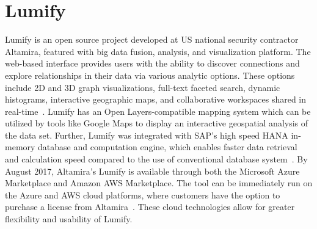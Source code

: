 \section{Lumify}
Lumify is an open source project developed at US national security contractor Altamira, featured with 
big data fusion, analysis, and visualization platform. The web-based interface provides users 
with the ability to discover connections and explore relationships in their data via various analytic 
options. These options include 2D and 3D graph visualizations, full-text faceted search, dynamic 
histograms, interactive geographic maps, and collaborative workspaces shared in 
real-time~\cite{hid-sp18-405-www-lumify}. Lumify has an Open Layers-compatible mapping system 
which can be utilized by tools like Google Maps to display an interactive geospatial analysis of the data 
set. Further, Lumify was integrated with SAP's high speed HANA in-memory database and computation 
engine, which enables faster data retrieval and calculation speed compared to the use of conventional 
database system~\cite{hid-sp18-405-linkedinblog-lumify}. By August 2017, Altamira’s Lumify is 
available through both the Microsoft Azure Marketplace and Amazon AWS Marketplace. The tool can 
be immediately run on the Azure and AWS cloud platforms, where customers have the option to 
purchase a license from 
Altamira~\cite{hid-sp18-405-wwwaws-lumify}\cite{hid-sp18-405-wwwazure-lumify}. These cloud 
technologies allow for greater flexibility and usability of Lumify. 